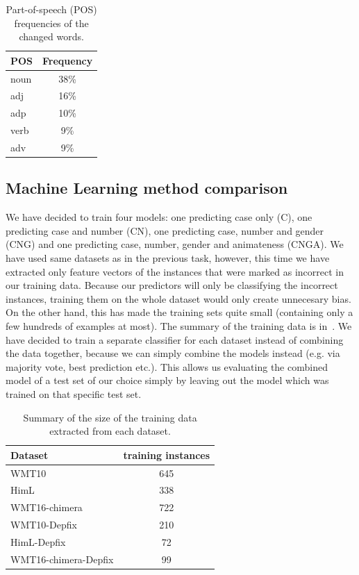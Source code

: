 \begin{table}[t]
\centering
\small

\begin{tabular}{lc}
POS  &  Frequency  \\
\hline
noun    &   38\%  \\
adj     &   16\%  \\
adp     &   10\%  \\
verb    &   9\%  \\
adv     &   9\%  \\
\end{tabular}
\caption{
    Part-of-speech (POS) frequencies of the changed words.
}
\label{changes-pos}
\end{table}


\subsection{Machine Learning method comparison}

We have decided to train four models: one predicting case only (C), one predicting case and number (CN),
 one predicting case, number and gender (CNG) and one predicting case, number, gender and animateness (CNGA).
We have used same datasets as in the previous task, however, this
time we have extracted only feature vectors of the instances that were marked as incorrect in our training data. Because
our predictors will only be classifying the incorrect instances, training them on the whole dataset would only create
unnecesary bias. On the other hand, this has made the training sets quite small (containing only a few hundreds of examples
at most). The summary of the training data is in~. We have decided to train a separate classifier
for each dataset instead of combining the data together, because we can simply combine the models instead (e.g. via majority
vote, best prediction etc.). This allows us evaluating the combined model of a test set of our choice simply by leaving
out the model which was trained on that specific test set.

\begin{table}[t]
\centering
\small

\begin{tabular}{lc}
Dataset  &  \hash{} training instances  \\
\hline
WMT10  &  645  \\
HimL  & 338  \\
WMT16-chimera  &  722  \\
WMT10-Depfix  &  210  \\
HimL-Depfix  &  72  \\
WMT16-chimera-Depfix  &  99  \\
\end{tabular}
\caption{
    Summary of the size of the training data extracted from each dataset.
}
\label{cats-training-sum}
\end{table}

